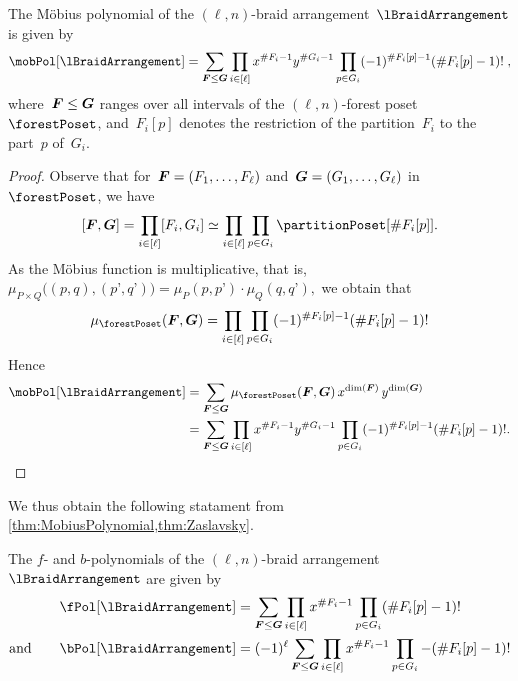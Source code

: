 \begin{theorem}
\label{thm:MobiusPolynomial}
The M\"obius polynomial of the $(\ell,n)$-braid arrangement~$\lBraidArrangement$ is given by
\[
\mobPol[\lBraidArrangement] = \sum_{\b{F} \le \b{G}} \prod_{i \in [\ell]} x^{\#F_i-1} y^{\#G_i-1} \prod_{p \in G_i} (-1)^{\#F_i[p]-1} (\# F_i[p]-1)! \; ,
\]
where~$\boldsymbol{F} \le \boldsymbol{G}$ ranges over all intervals of the $(\ell,n)$-forest poset~$\forestPoset$, and~$F_i[p]$ denotes the restriction of the partition~$F_i$ to the part~$p$ of~$G_i$.
\end{theorem}

\begin{proof}
Observe that for~$\boldsymbol{F} = (F_1, \dots, F_\ell)$ and~$\boldsymbol{G} = (G_1, \dots, G_\ell)$ in~$\forestPoset$, we have
\[
[\b{F}, \b{G}] = \prod_{i \in [\ell]} [F_i, G_i] \simeq \prod_{i \in [\ell]} \prod_{p \in G_i} \partitionPoset[{\#F_i[p]}].
\]
As the M\"obius function is multiplicative, that is,
\(
\mu_{P \times Q} \big( (p,q), (p’,q’) \big) = \mu_P(p,p’) \cdot \mu_Q(q,q’),
\)
we obtain that
\[
\mu_{\forestPoset}(\b{F}, \b{G}) = \prod_{i \in [\ell]} \prod_{p \in G_i} (-1)^{\#F_i[p]-1} (\# F_i[p]-1)!
\]
Hence
\begin{align*}
\mobPol[\lBraidArrangement] 
& = \sum_{\b{F} \le \b{G}} \mu_{\forestPoset}(\b{F}, \b{G}) \, x^{\dim(\b{F})} \, y^{\dim(\b{G})} \\
& = \sum_{\b{F} \le \b{G}} \prod_{i \in [\ell]} x^{\#F_i-1} y^{\#G_i-1} \prod_{p \in G_i} (-1)^{\#F_i[p]-1} (\# F_i[p]-1)!.
\qedhere
\end{align*}
\end{proof}

We thus obtain the following statament from \cref{thm:MobiusPolynomial,thm:Zaslavsky}.

\begin{corollary}
\label{coro:fbvectorslBraidArrangement}
The $f$- and $b$-polynomials of the $(\ell,n)$-braid arrangement~$\lBraidArrangement$ are given by
\begin{align*}
\fPol[\lBraidArrangement] & = \sum_{\b{F} \le \b{G}} \prod_{i \in [\ell]} x^{\#F_i-1} \prod_{p \in G_i} (\# F_i[p]-1)!\\
\text{and}\qquad
\bPol[\lBraidArrangement] & = (-1)^\ell \sum_{\b{F} \le \b{G}} \prod_{i \in [\ell]} x^{\#F_i-1} \prod_{p \in G_i} -(\# F_i[p]-1)!
\end{align*}
\end{corollary}

